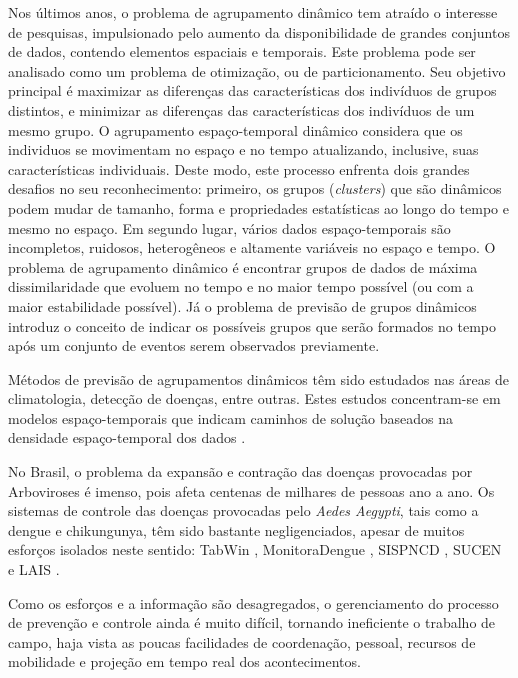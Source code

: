 Nos últimos anos, o problema de agrupamento dinâmico tem atraído o interesse de pesquisas, impulsionado pelo aumento da disponibilidade de grandes conjuntos de dados, contendo elementos espaciais e temporais. Este problema pode ser analisado como um problema de otimização, ou de particionamento. Seu objetivo principal é maximizar as diferenças das características dos indivíduos de grupos distintos, e minimizar as diferenças das características dos indivíduos de um mesmo grupo. O agrupamento espaço-temporal dinâmico considera que os individuos se movimentam no espaço e no tempo atualizando, inclusive, suas características individuais. Deste modo, este processo enfrenta dois grandes desafios no seu reconhecimento: primeiro, os grupos (\textit{clusters}) que são dinâmicos podem mudar de tamanho, forma e propriedades estatísticas ao longo do tempo e mesmo no espaço. Em segundo lugar, vários dados espaço-temporais são incompletos, ruidosos, heterogêneos e altamente variáveis no espaço e tempo. O problema de agrupamento dinâmico é encontrar grupos de dados de máxima dissimilaridade que evoluem no tempo e no maior tempo possível (ou com a maior estabilidade possível). Já o problema de previsão de grupos dinâmicos introduz o conceito de indicar os possíveis grupos que serão formados no tempo após um conjunto de eventos serem observados previamente.

Métodos de previsão de agrupamentos dinâmicos têm sido estudados nas áreas de climatologia, detecção de doenças, entre outras. Estes estudos concentram-se em modelos espaço-temporais que indicam caminhos de solução baseados na densidade espaço-temporal dos dados \cite{gupta:2014}. 

No Brasil, o problema da expansão e contração das doenças provocadas por Arboviroses é imenso, pois afeta centenas de milhares de pessoas ano a ano. Os sistemas de controle das doenças provocadas pelo \emph{Aedes Aegypti}, tais como a dengue e chikungunya, têm sido bastante negligenciados, apesar de muitos esforços isolados neste sentido: TabWin \cite{tabwin}, MonitoraDengue \cite{monitoraDengue}, \acrshort{SISPNCD} \cite{fad}, \acrshort{SUCEN} \cite{sucen} e \acrshort{LAIS} \cite{laisrn}.

Como os esforços e a informação são desagregados, o gerenciamento do processo de prevenção e controle ainda é muito difícil, tornando ineficiente o trabalho de campo, haja vista as poucas facilidades de coordenação, pessoal, recursos de mobilidade e projeção em tempo real dos acontecimentos.

